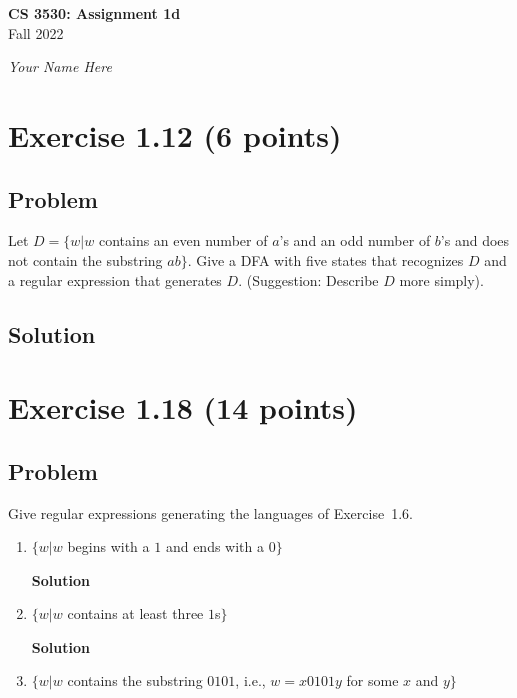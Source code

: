 \documentclass{article}
\begin{document}
\begin{empfile}

\begin{center}
\textbf{\Large CS 3530: Assignment 1d} \\[2mm]
Fall 2022

\emph{Your Name Here}
\end{center}

\raggedright

\section*{Exercise 1.12 (6 points)}

\subsection*{Problem}

Let $D=\{w|w$ contains an even number of $a$'s and an odd number of
$b$'s and does not contain the substring $ab\}$. Give a DFA with
five states that recognizes $D$ and a regular expression that
generates $D$. (Suggestion: Describe $D$ more simply).

\subsection*{Solution}

\section*{Exercise 1.18 (14 points)}

\subsection*{Problem}

Give regular expressions generating the languages of Exercise~1.6.

\begin{enumerate}[\bfseries a.]
\item $\{w| w$ begins with a $1$ and ends with a $0\}$

\textbf{Solution}

\item $\{w| w$ contains at least three $1$s$\}$

\textbf{Solution}

\item $\{w| w$ contains the substring $0101$, i.e., $w=x0101y$ for
some $x$ and $y\}$


\end{enumerate}
\end{empfile}
\end{document}
